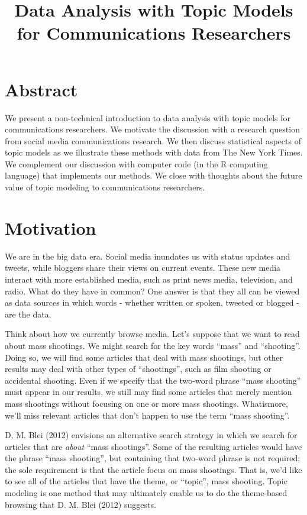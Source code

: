 \documentclass[12pt,]{article}
\title{Data Analysis with Topic Models for Communications Researchers}
\author{}
\date{}
\begin{document}
\maketitle

\pagestyle{fancy}

\section{Abstract}\label{abstract}

We present a non-technical introduction to data analysis with topic
models for communications researchers. We motivate the discussion with a
research question from social media communications research. We then
discuss statistical aspects of topic models as we illustrate these
methods with data from The New York Times. We complement our discussion
with computer code (in the R computing language) that implements our
methods. We close with thoughts about the future value of topic modeling
to communications researchers.

\section{Motivation}\label{motivation}

We are in the big data era. Social media inundates us with status
updates and tweets, while bloggers share their views on current events.
These new media interact with more established media, such as print news
media, television, and radio. What do they have in common? One answer is
that they all can be viewed as data sources in which words - whether
written or spoken, tweeted or blogged - are the data.

Think about how we currently browse media. Let's suppose that we want to
read about mass shootings. We might search for the key words ``mass''
and ``shooting''. Doing so, we will find some articles that deal with
mass shootings, but other results may deal with other types of
``shootings'', such as film shooting or accidental shooting. Even if we
specify that the two-word phrase ``mass shooting'' must appear in our
results, we still may find some articles that merely mention mass
shootings without focusing on one or more mass shootings. Whatismore,
we'll miss relevant articles that don't happen to use the term ``mass
shooting''.

D. M. Blei (2012) envisions an alternative search strategy in which we
search for articles that are \emph{about} ``mass shootings''. Some of
the resulting articles would have the phrase ``mass shooting'', but
containing that two-word phrase is not required; the sole requirement is
that the article focus on mass shootings. That is, we'd like to see all
of the articles that have the theme, or ``topic'', mass shooting. Topic
modeling is one method that may ultimately enable us to do the
theme-based browsing that D. M. Blei (2012) suggests.
\end{document}
